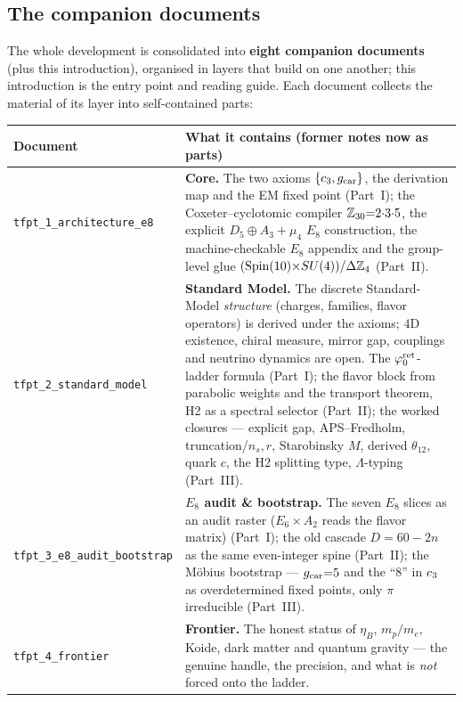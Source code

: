 \TFPTanchorcockpit

\subsection*{The companion documents}

\noindent The whole development is consolidated into \textbf{eight companion documents} (plus
this introduction), organised in layers that build on one another; this introduction is the entry point
and reading guide. Each document collects the material of its layer into self-contained parts:

\begin{center}\scriptsize
\renewcommand{\arraystretch}{1.25}
\begin{tabularx}{\linewidth}{@{}p{3.6cm}Y@{}}
\toprule
\textbf{Document} & \textbf{What it contains (former notes now as parts)} \\
\midrule
\texttt{tfpt\_1\_architecture\_e8} & \textbf{Core.} The two axioms $\{c_3,g_{\mathrm{car}}\}$, the derivation map and the EM fixed point (Part~I); the Coxeter--cyclotomic compiler $\mathbb{Z}_{30}{=}2{\cdot}3{\cdot}5$, the explicit $D_5{\oplus}A_3{+}\mu_4$ $E_8$ construction, the machine-checkable $E_8$ appendix and the group-level glue $(\mathrm{Spin}(10){\times}SU(4))/\Delta\mathbb{Z}_4$ (Part~II). \\
\texttt{tfpt\_2\_standard\_model} & \textbf{Standard Model.} The discrete Standard-Model \emph{structure} (charges, families, flavor operators) is derived under the axioms; $4$D existence, chiral measure, mirror gap, couplings and neutrino dynamics are open.  The $\varphi_0^{\mathrm{ret}}$-ladder formula (Part~I); the flavor block from parabolic weights and the transport theorem, H2 as a spectral selector (Part~II); the worked closures --- explicit gap, APS--Fredholm, truncation/$n_s,r$, Starobinsky $M$, derived $\theta_{12}$, quark $c$, the H2 splitting type, $\Lambda$-typing (Part~III). \\
\texttt{tfpt\_3\_e8\_audit\_bootstrap} & \textbf{$E_8$ audit \& bootstrap.} The seven $E_8$ slices as an audit raster ($E_6{\times}A_2$ reads the flavor matrix) (Part~I); the old cascade $D{=}60{-}2n$ as the same even-integer spine (Part~II); the M\"obius bootstrap --- $g_{\mathrm{car}}{=}5$ and the ``$8$'' in $c_3$ as overdetermined fixed points, only $\pi$ irreducible (Part~III). \\
\texttt{tfpt\_4\_frontier} & \textbf{Frontier.} The honest status of $\eta_B$, $m_p/m_e$, Koide, dark matter and quantum gravity --- the genuine handle, the precision, and what is \emph{not} forced onto the ladder. \\

\end{tabularx}
\end{center}

